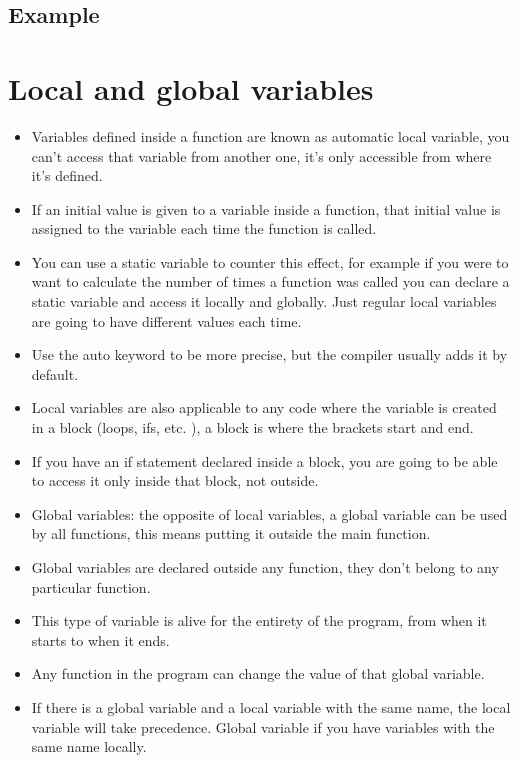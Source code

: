 \subsection{Example}


\section{Local and global variables}
\begin{itemize}
    \item Variables defined inside a function are known as automatic local variable, you can't access that variable from another one, it's only accessible from where it's defined. 
    \item If an initial value is given to a variable inside a function, that initial value is assigned to the variable each time the function is called. 
    \item You can use a static variable to counter this effect, for example if you were to want to calculate the number of times a function was called you can declare a static variable and access it locally and globally. Just regular local variables are going to have different values each time.
    \item Use the auto keyword to be more precise, but the compiler usually adds it by default. 
    \item Local variables are also applicable to any code where the variable is created in a block (loops, ifs, etc. ), a block is where the brackets start and end. 
    \item If you have an if statement declared inside a block, you are going to be able to access it only inside that block, not outside. 
    \item Global variables: the opposite of local variables, a global variable can be used by all functions, this means putting it outside the main function. 
    \item Global variables are declared outside any function, they don't belong to any particular function. 
    \item This type of variable is alive for the entirety of the program, from when it starts to when it ends. 
    \item Any function in the program can change the value of that global variable. 
    \item If there is a global variable and a local variable with the same name, the local variable will take precedence. Global variable if you have variables with the same name locally. 

\end{itemize}
